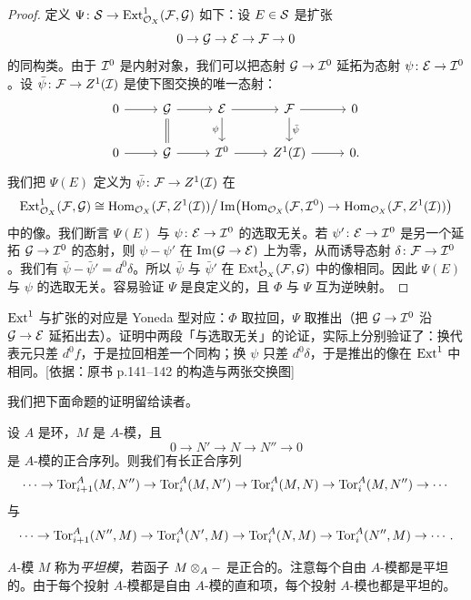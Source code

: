 \begin{proof}
定义 $\Psi\colon\mathcal{S}\to\operatorname{Ext}^1_{\mathcal{O}_X}(\mathcal{F},\mathcal{G})$ 如下：设 $E\in\mathcal{S}$ 是扩张
\[
0\to\mathcal{G}\to\mathcal{E}\to\mathcal{F}\to 0
\]
的同构类。由于 $\mathcal{I}^0$ 是内射对象，我们可以把态射 $\mathcal{G}\to\mathcal{I}^0$ 延拓为态射 $\psi\colon\mathcal{E}\to\mathcal{I}^0$。设 $\bar\psi\colon\mathcal{F}\to Z^1(\mathcal{I})$ 是使下图交换的唯一态射：
\[\begin{tikzcd}[column sep=2.6em,row sep=1.8em]
0 \arrow[r] & \cG \arrow[r] \arrow[d,equal] & \cE \arrow[r] \arrow[d,"\psi"'] & \cF \arrow[r] \arrow[d,"\bar\psi"] & 0 \\
0 \arrow[r] & \cG \arrow[r] & \cI^0 \arrow[r] & Z^1(\cI) \arrow[r] & 0.
\end{tikzcd}\]
我们把 $\Psi(E)$ 定义为 $\bar\psi\colon\mathcal{F}\to Z^1(\mathcal{I})$ 在
\[
\operatorname{Ext}^1_{\mathcal{O}_X}(\mathcal{F},\mathcal{G})\cong\operatorname{Hom}_{\mathcal{O}_X}(\mathcal{F},Z^1(\mathcal{I}))\big/\operatorname{Im}\bigl(\operatorname{Hom}_{\mathcal{O}_X}(\mathcal{F},\mathcal{I}^0)\to\operatorname{Hom}_{\mathcal{O}_X}(\mathcal{F},Z^1(\mathcal{I}))\bigr)
\]
中的像。我们断言 $\Psi(E)$ 与 $\psi\colon\mathcal{E}\to\mathcal{I}^0$ 的选取无关。若 $\psi'\colon\mathcal{E}\to\mathcal{I}^0$ 是另一个延拓 $\mathcal{G}\to\mathcal{I}^0$ 的态射，则 $\psi-\psi'$ 在 $\operatorname{Im}(\mathcal{G}\to\mathcal{E})$ 上为零，从而诱导态射 $\delta\colon\mathcal{F}\to\mathcal{I}^0$。我们有 $\bar\psi-\bar\psi'=d^0\delta$。所以 $\bar\psi$ 与 $\bar\psi'$ 在 $\operatorname{Ext}^1_{\mathcal{O}_X}(\mathcal{F},\mathcal{G})$ 中的像相同。因此 $\Psi(E)$ 与 $\psi$ 的选取无关。容易验证 $\Psi$ 是良定义的，且 $\Phi$ 与 $\Psi$ 互为逆映射。
\end{proof}
\begin{tnote}
$\operatorname{Ext}^1$ 与扩张的对应是 Yoneda 型对应：$\Phi$ 取拉回，$\Psi$ 取推出（把 $\mathcal{G}\to\mathcal{I}^0$ 沿 $\mathcal{G}\to\mathcal{E}$ 延拓出去）。证明中两段「与选取无关」的论证，实际上分别验证了：换代表元只差 $d^0f$，于是拉回相差一个同构；换 $\psi$ 只差 $d^0\delta$，于是推出的像在 $\operatorname{Ext}^1$ 中相同。[依据：原书 p.141--142 的构造与两张交换图]
\end{tnote}

我们把下面命题的证明留给读者。

\begin{proposition}\label{it:2.1.16}
设 $A$ 是环，$M$ 是 $A$-模，且
\[
0\to N'\to N\to N''\to 0
\]
是 $A$-模的正合序列。则我们有长正合序列
\[
\cdots\to\operatorname{Tor}^A_{i+1}(M,N'')\to\operatorname{Tor}^A_i(M,N')\to\operatorname{Tor}^A_i(M,N)\to\operatorname{Tor}^A_i(M,N'')\to\cdots
\]
与
\[
\cdots\to\operatorname{Tor}^A_{i+1}(N'',M)\to\operatorname{Tor}^A_i(N',M)\to\operatorname{Tor}^A_i(N,M)\to\operatorname{Tor}^A_i(N'',M)\to\cdots.
\]
\end{proposition}

$A$-模 $M$ 称为\emph{平坦模}，若函子 $M\otimes_A-$ 是正合的。注意每个自由 $A$-模都是平坦的。由于每个投射 $A$-模都是自由 $A$-模的直和项，每个投射 $A$-模也都是平坦的。

